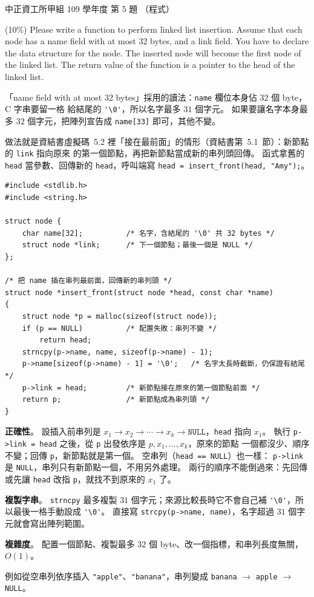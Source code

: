 \begin{pastexam}[label={px:ccu-109-swa-02}]{中正資工所甲組 109 學年度 第 5 題}
（程式）

(10\%) Please write a function to perform linked list insertion. Assume that each node has a name
field with at most 32 bytes, and a link field. You have to declare the data structure for the node.
The inserted node will become the first node of the linked list. The return value of the function
is a pointer to the head of the linked list.
\end{pastexam}

\begin{pastsoln}
「name field with at most 32 bytes」採用的讀法：\texttt{name} 欄位本身佔 $32$ 個 byte，C 字串要留一格
給結尾的 \verb|'\0'|，所以名字最多 $31$ 個字元。 如果要讓名字本身最多 $32$ 個字元，把陣列宣告成
\texttt{name[33]} 即可，其他不變。

做法就是資結書虛擬碼~5.2 裡「接在最前面」的情形（資結書第~5.1~節）：新節點的 \texttt{link} 指向原來
的第一個節點，再把新節點當成新的串列頭回傳。 函式拿舊的 \texttt{head} 當參數、回傳新的
\texttt{head}，呼叫端寫 \texttt{head = insert\_front(head, "Amy");}。

\begin{verbatim}
#include <stdlib.h>
#include <string.h>

struct node {
    char name[32];          /* 名字，含結尾的 '\0' 共 32 bytes */
    struct node *link;      /* 下一個節點；最後一個是 NULL */
};

/* 把 name 插在串列最前面，回傳新的串列頭 */
struct node *insert_front(struct node *head, const char *name)
{
    struct node *p = malloc(sizeof(struct node));
    if (p == NULL)          /* 配置失敗：串列不變 */
        return head;
    strncpy(p->name, name, sizeof(p->name) - 1);
    p->name[sizeof(p->name) - 1] = '\0';   /* 名字太長時截斷，仍保證有結尾 */
    p->link = head;         /* 新節點接在原來的第一個節點前面 */
    return p;               /* 新節點成為串列頭 */
}
\end{verbatim}

\textbf{正確性}。 設插入前串列是 $x_1 \to x_2 \to \cdots \to x_k \to \texttt{NULL}$，\texttt{head} 指向
$x_1$。 執行 \texttt{p->link = head} 之後，從 \texttt{p} 出發依序是 $p, x_1, \ldots, x_k$，原來的節點
一個都沒少、順序不變；回傳 \texttt{p}，新節點就是第一個。 空串列（\texttt{head == NULL}）也一樣：
\texttt{p->link} 是 \texttt{NULL}，串列只有新節點一個，不用另外處理。 兩行的順序不能倒過來：先回傳
或先讓 \texttt{head} 改指 \texttt{p}，就找不到原來的 $x_1$ 了。

\textbf{複製字串}。 \texttt{strncpy} 最多複製 $31$ 個字元；來源比較長時它不會自己補
\verb|'\0'|，所以最後一格手動設成 \verb|'\0'|。 直接寫 \texttt{strcpy(p->name, name)}，名字超過
$31$ 個字元就會寫出陣列範圍。

\textbf{複雜度}。 配置一個節點、複製最多 $32$ 個 byte、改一個指標，和串列長度無關，$O(1)$。

例如從空串列依序插入 \texttt{"apple"}、\texttt{"banana"}，串列變成
\texttt{banana} $\to$ \texttt{apple} $\to$ \texttt{NULL}。
\end{pastsoln}

